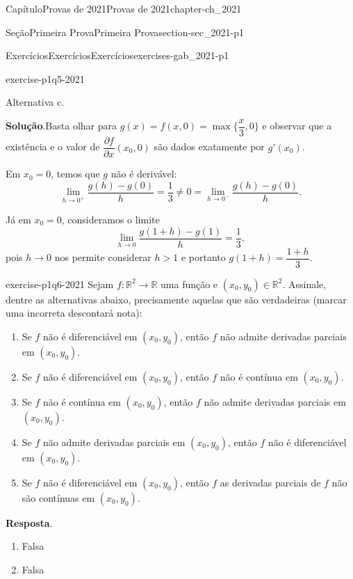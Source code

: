 \documentclass[oneside,10pt,]{book}
\newcommand{\blocktitlefont}{\relax}
\numberwithin{equation}{section}
\newcommand{\R}{\mathbb R}
\begin{document}
\begin{chapterptx}{Capítulo}{Provas de 2021}{}{Provas de 2021}{}{}{chapter-ch_2021}
\begin{sectionptx}{Seção}{Primeira Prova}{}{Primeira Prova}{}{}{section-sec_2021-p1}
\begin{exercises-subsection-numberless}{Exercícios}{Exercícios}{}{Exercícios}{}{}{exercises-gab_2021-p1}
\begin{divisionexercise}{5}{}{}{exercise-p1q5-2021}
\par
Alternativa c.%
\par\smallskip%
\noindent\textbf{\blocktitlefont Solução}.\hypertarget{solution-p1q5-2021-d}{}\quad{}Basta olhar para \(g(x)=f(x,0)=\max\Big\{\dfrac{x}{3},0\Big\}\) e observar que a existência e o valor de \(\dfrac{\partial f}{\partial
x}(x_0,0)\) são dados exatamente por \(g'(x_0)\).%
\par
Em \(x_0=0\), temos que \(g\) não é derivável:%
\begin{equation*}
\lim\limits_{h\to 0^+}\dfrac{g(h)-g(0)}{h}=\dfrac{1}{3}\neq
0=\lim\limits_{h\to 0^-}\dfrac{g(h)-g(0)}{h}.
\end{equation*}
%
\par
Já em \(x_0=0\), consideramos o limite%
\begin{equation*}
\lim\limits_{h\to
0}\dfrac{g(1+h)-g(1)}{h}=\dfrac{1}{3},
\end{equation*}
pois \(h\to 0\) nos permite considerar \(h>1\) e portanto \(g(1+h)=\dfrac{1+h}{3}\).%
\end{divisionexercise}%
\begin{divisionexercise}{6}{}{}{exercise-p1q6-2021}%
Sejam \(f\colon\R^2\to\R\) uma função e \((x_0,y_0)\in\R^2\). Assinale, dentre as alternativas abaixo, precisamente aquelas que são verdadeiras (marcar uma incorreta descontará nota):%
\begin{enumerate}[label=\alph*]
\item{}Se \(f\) não é diferenciável em \((x_0,y_0)\), então \(f\) não admite derivadas parciais em \((x_0,y_0)\).%
\item{}Se \(f\) não é diferenciável em \((x_0,y_0)\), então \(f\) não é contínua em \((x_0,y_0)\).%
\item{}Se \(f\) não é contínua em \((x_0,y_0)\), então \(f\) não admite derivadas parciais em \((x_0,y_0)\).%
\item{}Se \(f\) não admite derivadas parciais em \((x_0,y_0)\), então \(f\) não é diferenciável em \((x_0,y_0)\).%
\item{}Se \(f\) não é diferenciável em \((x_0,y_0)\), então \(f\) as derivadas parciais de \(f\) não são contínuas em \((x_0,y_0)\).%
\end{enumerate}
%
\par\smallskip%
\noindent\textbf{\blocktitlefont Resposta}.\hypertarget{answer-p1q6-2021-b}{}\quad{}%
\begin{enumerate}[label=\alph*]
\item{}Falsa%
\item{}Falsa%

\end{enumerate}
\end{divisionexercise}
\end{exercises-subsection-numberless}
\end{sectionptx}
\end{chapterptx}
\end{document}
